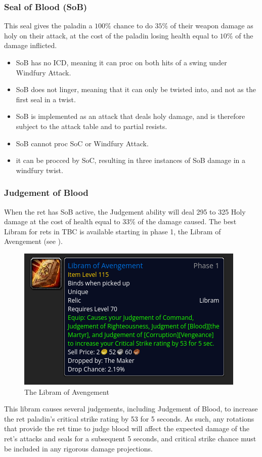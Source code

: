 \documentclass[letterpaper,11pt]{article}
\begin{document}
	\subsubsection{Seal of Blood (SoB)}
	\label{sec:sob}
 	This seal gives the paladin a $100 \%$ chance to do $35 \%$ of their weapon damage as holy on their attack, at the cost of the paladin losing health equal to $10 \%$ of the damage inflicted.
	\begin{itemize}
		\item SoB has no ICD, meaning it can proc on both hits of a swing under Windfury Attack.
		\item SoB does not linger, meaning that it can only be twisted into, and not as the first seal in a twist.
		\item SoB is implemented as an attack that deals holy damage, and is therefore subject to the attack table and to partial resists.
		\item SoB cannot proc SoC or Windfury Attack.
		\item it can be procced by SoC, resulting in three instances of SoB damage in a windfury twist.
	\end{itemize}
 	
	\subsubsection{Judgement of Blood}
	When the ret has SoB active, the Judgement ability will deal 295 to 325 Holy damage at the cost of health equal to $33 \%$ of the damage caused.
	The best Libram for rets in TBC is available starting in phase 1, the Libram of Avengement (see ).
	\begin{figure}[ht] 
		\centering \includegraphics[width=0.44\columnwidth]{figs/libram_of_avengement.png}
		\caption{The Libram of Avengement}
		\label{fig:loa}
	\end{figure}
	This libram causes several judgements, including Judgement of Blood, to increase the ret paladin's critical strike rating by 53 for 5 seconds.
	As such, any rotations that provide the ret time to judge blood will affect the expected damage of the ret's attacks and seals for a subsequent 5 seconds, and critical strike chance must be included in any rigorous damage projections.
	
\end{document}
